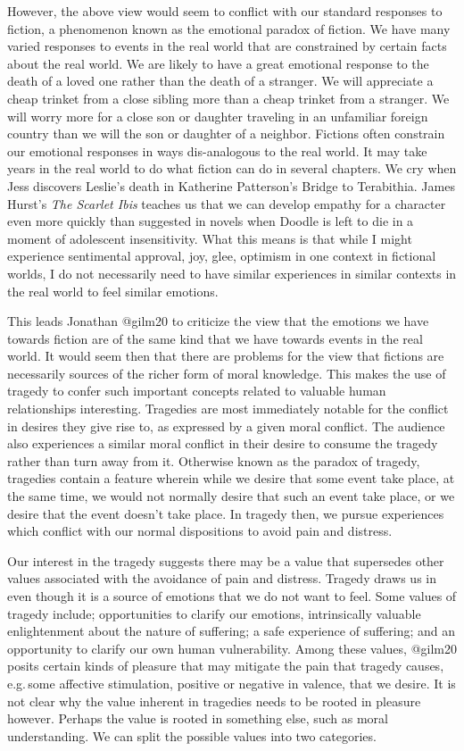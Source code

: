 \documentclass[
  letterpaper,
  DIV=11,
  numbers=noendperiod]{scrartcl}
\theoremstyle{remark}
\begin{document}
However, the above view would seem to conflict with our standard
responses to fiction, a phenomenon known as the emotional paradox of
fiction. We have many varied responses to events in the real world that
are constrained by certain facts about the real world. We are likely to
have a great emotional response to the death of a loved one rather than
the death of a stranger. We will appreciate a cheap trinket from a close
sibling more than a cheap trinket from a stranger. We will worry more
for a close son or daughter traveling in an unfamiliar foreign country
than we will the son or daughter of a neighbor. Fictions often constrain
our emotional responses in ways dis-analogous to the real world. It may
take years in the real world to do what fiction can do in several
chapters. We cry when Jess discovers Leslie's death in Katherine
Patterson's Bridge to Terabithia. James Hurst's \emph{The Scarlet Ibis}
teaches us that we can develop empathy for a character even more quickly
than suggested in novels when Doodle is left to die in a moment of
adolescent insensitivity. What this means is that while I might
experience sentimental approval, joy, glee, optimism in one context in
fictional worlds, I do not necessarily need to have similar experiences
in similar contexts in the real world to feel similar emotions.

This leads Jonathan @gilm20 to criticize the view that the emotions we
have towards fiction are of the same kind that we have towards events in
the real world. It would seem then that there are problems for the view
that fictions are necessarily sources of the richer form of moral
knowledge. This makes the use of tragedy to confer such important
concepts related to valuable human relationships interesting. Tragedies
are most immediately notable for the conflict in desires they give rise
to, as expressed by a given moral conflict. The audience also
experiences a similar moral conflict in their desire to consume the
tragedy rather than turn away from it. Otherwise known as the paradox of
tragedy, tragedies contain a feature wherein while we desire that some
event take place, at the same time, we would not normally desire that
such an event take place, or we desire that the event doesn't take
place. In tragedy then, we pursue experiences which conflict with our
normal dispositions to avoid pain and distress.

Our interest in the tragedy suggests there may be a value that
supersedes other values associated with the avoidance of pain and
distress. Tragedy draws us in even though it is a source of emotions
that we do not want to feel. Some values of tragedy include;
opportunities to clarify our emotions, intrinsically valuable
enlightenment about the nature of suffering; a safe experience of
suffering; and an opportunity to clarify our own human vulnerability.
Among these values, @gilm20 posits certain kinds of pleasure that may
mitigate the pain that tragedy causes, e.g.\,some affective stimulation,
positive or negative in valence, that we desire. It is not clear why the
value inherent in tragedies needs to be rooted in pleasure however.
Perhaps the value is rooted in something else, such as moral
understanding. We can split the possible values into two categories.
\end{document}
